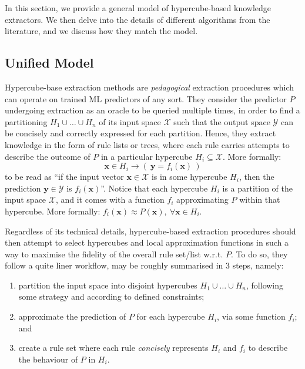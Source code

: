 \documentclass[
]{ceurart}
\begin{document}
In this section, we provide a general model of hypercube-based knowledge extractors.
%
We then delve into the details of different algorithms from the literature, and we discuss how they match the model.

\subsection{Unified Model}

Hypercube-base extraction methods are \emph{pedagogical} extraction procedures which can operate on trained ML predictors of any sort.
%
They consider the predictor $P$ undergoing extraction as an oracle to be queried multiple times, in order to find a partitioning $H_1 \cup \ldots \cup H_n$ of its input space $\mathcal{X}$ such that the output space $\mathcal{Y}$ can be concisely and correctly expressed for each partition.
%
Hence, they extract knowledge in the form of rule lists or trees, where each rule carries attempts to describe the outcome of $P$ in a particular hypercube $H_i \subseteq \mathcal{X}$. 
%
More formally: 
%
\[ \mathbf{x} \in H_i \rightarrow (~\mathbf{y} = f_i(\mathbf{x})~) \]  
%
to be read as ``if the input vector $\mathbf{x} \in \mathcal{X}$ is in some hypercube $H_i$, then the prediction $\mathbf{y} \in \mathcal{Y}$ is $f_i(\mathbf{x})$''.
%
Notice that each hypercube $H_i$ is a partition of the input space $\mathcal{X}$, and it comes with a function $f_i$ approximating $P$ within that hypercube.
%
More formally: $f_i(\mathbf{x}) \approx P(\mathbf{x}),~\forall \mathbf{x} \in H_i$.

Regardless of its technical details, hypercube-based extraction procedures should then attempt to select hypercubes and local approximation functions in such a way to maximise the fidelity of the overall rule set/list w.r.t. $P$.
%
To do so, they follow a quite liner workflow, may be roughly summarised in 3 steps, namely:
%
\begin{enumerate}
	\item partition the input space into disjoint hypercubes $H_1 \cup \ldots \cup H_n$, following some strategy and according to defined constraints;
	\item approximate the prediction of $P$ for each hypercube $H_i$, via some function $f_i$; and
	\item create a rule set where each rule \emph{concisely} represents $H_i$ and $f_i$ to describe the behaviour of $P$ in $H_i$.
\end{enumerate}
%
\end{document}
